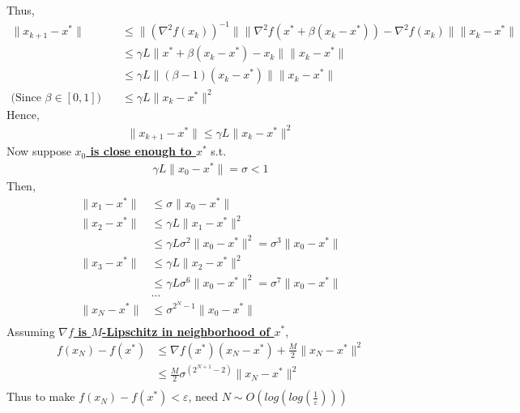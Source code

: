 \documentclass[11pt]{elegantbook}
\begin{document}
Thus,
\begin{equation}
    \begin{aligned}
        \|x_{k+1}-x^*\|&\leq \|(\nabla^2 f(x_k))^{-1}\|\|\nabla^2 f(x^*+\beta(x_k-x^*))-\nabla^2 f(x_k)\|\|x_k-x^*\|\\
        &\leq \gamma L\|x^*+\beta(x_k-x^*)-x_k\|\|x_k-x^*\|\\
        &\leq \gamma L\|(\beta-1)(x_k-x^*)\|\|x_k-x^*\|\\
        \text{(Since $\beta\in [0,1]$)}\quad&\leq \gamma L\|x_k-x^*\|^2
    \end{aligned}
    \nonumber
\end{equation}
Hence,
\begin{equation}
    \begin{aligned}
        \|x_{k+1}-x^*\|\leq \gamma L\|x_k-x^*\|^2
    \end{aligned}
    \nonumber
\end{equation}
Now suppose \textbf{\underline{$x_0$ is close enough to $x^*$}} s.t.
\begin{equation}
    \begin{aligned}
        \gamma L\|x_0-x^*\|=\sigma<1
    \end{aligned}
    \nonumber
\end{equation}
Then,
\begin{equation}
    \begin{aligned}
        \|x_1-x^*\|&\leq \sigma\|x_0-x^*\|\\
        \|x_2-x^*\|&\leq \gamma L\|x_1-x^*\|^2\\
        &\leq \gamma L\sigma^2\|x_0-x^*\|^2=\sigma^3\|x_0-x^*\|\\
        \|x_3-x^*\|&\leq \gamma L\|x_2-x^*\|^2\\
        &\leq \gamma L\sigma^6\|x_0-x^*\|^2=\sigma^7\|x_0-x^*\|\\
        &\dots\\
        \|x_N-x^*\|&\leq \sigma^{2^N-1}\|x_0-x^*\|\\
    \end{aligned}
    \nonumber
\end{equation}
Assuming \textbf{\underline{$\nabla f$ is $M$-Lipschitz in neighborhood of $x^*$}},
\begin{equation}
    \begin{aligned}
        f(x_N)-f(x^*)&\leq \nabla f(x^*)(x_N-x^*)+\frac{M}{2}\|x_N-x^*\|^2\\
        &\leq \frac{M}{2}\sigma^{(2^{N+1}-2)}\|x_N-x^*\|^2\\
    \end{aligned}
    \nonumber
\end{equation}
Thus to make $f(x_N)-f(x^*)<\varepsilon$, need $N\sim O(log(log(\frac{1}{\varepsilon})))$
\end{document}
